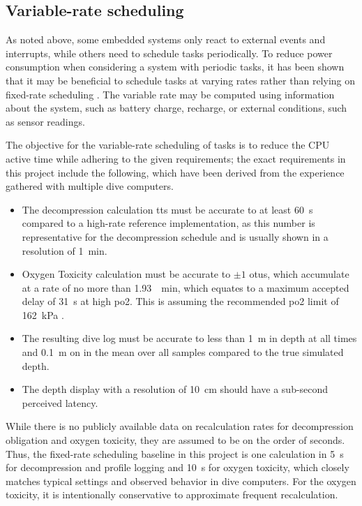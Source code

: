 \subsection{Variable-rate scheduling}
As noted above, some embedded systems only react to external events and interrupts, while others need to schedule tasks periodically.
To reduce power consumption when considering a system with periodic tasks, it has been shown that it may be beneficial to schedule tasks at varying rates rather than relying on fixed-rate scheduling \cite{survey-adaptive-sampling-filtering} \cite{2020-dsra} \cite{2023-eth-energy-aware}.
The variable rate may be computed using information about the system, such as battery charge, recharge, or external conditions, such as sensor readings.

The objective for the variable-rate scheduling of tasks is to reduce the CPU active time while adhering to the given requirements; the exact requirements in this project include the following, which have been derived from the experience gathered with multiple dive computers.

\begin{itemize}
    \item The decompression calculation \gls{tts} must be accurate to at least \SI{60}{\second} compared to a high-rate reference implementation, as this number is representative for the decompression schedule and is usually shown in a resolution of \SI{1}{\minute}.
    \item Oxygen Toxicity calculation must be accurate to $\pm 1$ \gls{otu}s, which accumulate at a rate of no more than \SI{1.93}{\per\minute}, which equates to a maximum accepted delay of \SI{31}{\second} at high \gls{po2}. This is assuming the recommended \gls{po2} limit of \SI{162}{\kPa} \cite{calculated-risk-pulmonary-cns}\cite{RevisedO2Tox2025}.
    \item The resulting dive log must be accurate to less than \SI{1}{\meter} in depth at all times and \SI{0.1}{\meter} on in the mean over all samples compared to the true simulated depth.
    \item The depth display with a resolution of \SI{10}{\centi\meter} should have a sub-second perceived latency.
\end{itemize}

While there is no publicly available data on recalculation rates for decompression obligation and oxygen toxicity, they are assumed to be on the order of seconds. 
Thus, the fixed-rate scheduling baseline in this project is one calculation in \SI{5}{\second} for decompression and profile logging and \SI{10}{\second} for oxygen toxicity, which closely matches typical settings and observed behavior in dive computers.
For the oxygen toxicity, it is intentionally conservative to approximate frequent recalculation.

